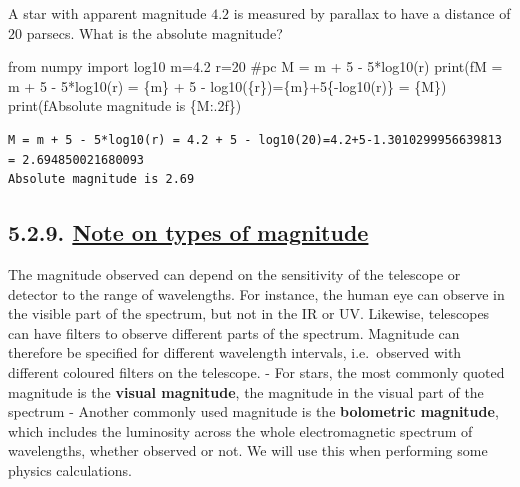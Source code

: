\documentclass[
  letterpaper,
  DIV=11,
  numbers=noendperiod]{scrreprt}
\newenvironment{Shaded}{\begin{snugshade}}{\end{snugshade}}
\newcommand{\BuiltInTok}[1]{\textcolor[rgb]{0.00,0.23,0.31}{#1}}
\newcommand{\CommentTok}[1]{\textcolor[rgb]{0.37,0.37,0.37}{#1}}
\newcommand{\DecValTok}[1]{\textcolor[rgb]{0.68,0.00,0.00}{#1}}
\newcommand{\FloatTok}[1]{\textcolor[rgb]{0.68,0.00,0.00}{#1}}
\newcommand{\ImportTok}[1]{\textcolor[rgb]{0.00,0.46,0.62}{#1}}
\newcommand{\NormalTok}[1]{\textcolor[rgb]{0.00,0.23,0.31}{#1}}
\newcommand{\OperatorTok}[1]{\textcolor[rgb]{0.37,0.37,0.37}{#1}}
\newcommand{\SpecialCharTok}[1]{\textcolor[rgb]{0.37,0.37,0.37}{#1}}
\newcommand{\SpecialStringTok}[1]{\textcolor[rgb]{0.13,0.47,0.30}{#1}}
\begin{document}
A star with apparent magnitude \(4.2\) is measured by parallax to have a
distance of \(20\) parsecs. What is the absolute magnitude?

\begin{Shaded}
\begin{Highlighting}[]
\ImportTok{from}\NormalTok{ numpy }\ImportTok{import}\NormalTok{ log10}
\NormalTok{m}\OperatorTok{=}\FloatTok{4.2}
\NormalTok{r}\OperatorTok{=}\DecValTok{20} \CommentTok{\#pc}
\NormalTok{M }\OperatorTok{=}\NormalTok{ m }\OperatorTok{+} \DecValTok{5} \OperatorTok{{-}} \DecValTok{5}\OperatorTok{*}\NormalTok{log10(r)}
\BuiltInTok{print}\NormalTok{(}\SpecialStringTok{f\textquotesingle{}M = m + 5 {-} 5*log10(r) = }\SpecialCharTok{\{}\NormalTok{m}\SpecialCharTok{\}}\SpecialStringTok{ + 5 {-} log10(}\SpecialCharTok{\{}\NormalTok{r}\SpecialCharTok{\}}\SpecialStringTok{)=}\SpecialCharTok{\{}\NormalTok{m}\SpecialCharTok{\}}\SpecialStringTok{+5}\SpecialCharTok{\{}\OperatorTok{{-}}\NormalTok{log10(r)}\SpecialCharTok{\}}\SpecialStringTok{ = }\SpecialCharTok{\{}\NormalTok{M}\SpecialCharTok{\}}\SpecialStringTok{\textquotesingle{}}\NormalTok{)}
\BuiltInTok{print}\NormalTok{(}\SpecialStringTok{f\textquotesingle{}Absolute magnitude is }\SpecialCharTok{\{}\NormalTok{M}\SpecialCharTok{:.2f\}}\SpecialStringTok{\textquotesingle{}}\NormalTok{)}
\end{Highlighting}
\end{Shaded}

\begin{verbatim}
M = m + 5 - 5*log10(r) = 4.2 + 5 - log10(20)=4.2+5-1.3010299956639813 = 2.694850021680093
Absolute magnitude is 2.69
\end{verbatim}

\hypertarget{note-on-types-of-magnitude}{%
\subsection{\texorpdfstring{5.2.9. \protect\hyperlink{toc0_}{Note on
types of
magnitude}}{5.2.9. Note on types of magnitude}}\label{note-on-types-of-magnitude}}

The magnitude observed can depend on the sensitivity of the telescope or
detector to the range of wavelengths. For instance, the human eye can
observe in the visible part of the spectrum, but not in the IR or UV.
Likewise, telescopes can have filters to observe different parts of the
spectrum. Magnitude can therefore be specified for different wavelength
intervals, i.e.~observed with different coloured filters on the
telescope. - For stars, the most commonly quoted magnitude is the
\textbf{visual magnitude}, the magnitude in the visual part of the
spectrum - Another commonly used magnitude is the \textbf{bolometric
magnitude}, which includes the luminosity across the whole
electromagnetic spectrum of wavelengths, whether observed or not. We
will use this when performing some physics calculations.
\end{document}

